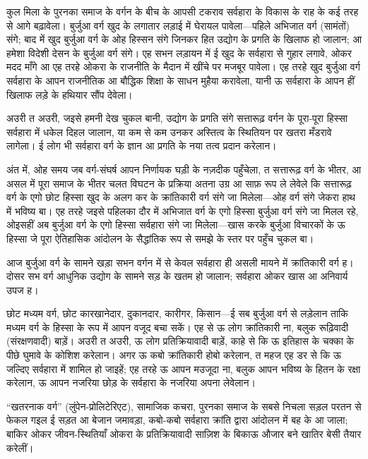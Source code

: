 \documentclass[12pt,a4paper,oneside]{book}
\begin{document}
कुल मिला के पुरनका समाज के वर्गन के बीच के आपसी टकराव सर्वहारा के विकास के राह के कई तरह से आगे बढ़ावेला। बुर्जुआ वर्ग खुद के लगातार लड़ाई में घेरायल पावेला—पहिले अभिजात वर्ग (सामंतों) संगे; बाद में खुद बुर्जुआ वर्ग के ओह हिस्सन संगे जिनकर हित उद्योग के प्रगति के खिलाफ हो जालान; आ हमेशा विदेशी देसन के बुर्जुआ वर्ग संगे। एह सभन लड़ायन में ई खुद के सर्वहारा से गुहार लगावे, ओकर मदद माँगे आ एह तरहे ओकरा के राजनीति के मैदान में खींचे पर मजबूर पावेला। एह तरहे खुद बुर्जुआ वर्ग सर्वहारा के आपन राजनीतिक आ बौद्धिक शिक्षा के साधन मुहैया करावेला, यानी ऊ सर्वहारा के आपन हीं खिलाफ लड़े के हथियार सौंप देवेला।

अउरी त अउरी, जइसे हमनी देख चुकल बानी, उद्योग के प्रगति संगे सत्तारूढ़ वर्गन के पूरा-पूरा हिस्सा सर्वहारा में धकेल दिहल जालान, या कम से कम उनकर अस्तित्व के स्थितियन पर खतरा मँडरावे लागेला। ई लोग भी सर्वहारा वर्ग के ज्ञान आ प्रगति के नया तत्व प्रदान करेलान।

अंत में, ओह समय जब वर्ग-संघर्ष आपन निर्णायक घड़ी के नज़दीक पहुँचेला, त सत्तारूढ़ वर्ग के भीतर, आ असल में पूरा समाज के भीतर चलत विघटन के प्रक्रिया अतना उग्र आ साफ़ रूप ले लेवेले कि सत्तारूढ़ वर्ग के एगो छोट हिस्सा खुद के अलग कर के क्रांतिकारी वर्ग संगे जा मिलेला—ओह वर्ग संगे जेकरा हाथ में भविष्य बा। एह तरहे जइसे पहिलका दौर में अभिजात वर्ग के एगो हिस्सा बुर्जुआ वर्ग संगे जा मिलल रहे, ओइसहीं अब बुर्जुआ वर्ग के एगो हिस्सा सर्वहारा संगे जा मिलेला—खास करके बुर्जुआ विचारकों के ऊ हिस्सा जे पूरा ऐतिहासिक आंदोलन के सैद्धांतिक रूप से समझे के स्तर पर पहुँच चुकल बा।

आज बुर्जुआ वर्ग के सामने खड़ा सभन वर्गन में से केवल सर्वहारा ही असली मायने में क्रांतिकारी वर्ग ह। दोसर सभ वर्ग आधुनिक उद्योग के सामने सड़ के खतम हो जालान; सर्वहारा ओकर खास आ अनिवार्य उपज ह।

छोट मध्यम वर्ग, छोट कारखानेदार, दुकानदार, कारीगर, किसान—ई सब बुर्जुआ वर्ग से लड़ेलान ताकि मध्यम वर्ग के हिस्सा के रूप में आपन वजूद बचा सकें। एह से ऊ लोग क्रांतिकारी ना, बलुक रूढ़िवादी (संरक्षणवादी) बाड़ें। अउरी त अउरी, ऊ लोग प्रतिक्रियावादी बाड़ें, काहे से कि ऊ इतिहास के चक्का के पीछे घुमावे के कोशिश करेलान। अगर ऊ कबो क्रांतिकारी होबो करेलान, त महज एह डर से कि ऊ जल्दिए सर्वहारा में शामिल हो जाइहें; एह तरहे ऊ आपन मउजूदा ना, बलुक आपन भविष्य के हितन के रक्षा करेलान, ऊ आपन नजरिया छोड़ के सर्वहारा के नजरिया अपना लेवेलान।

“खतरनाक वर्ग” (लुंपेन-प्रोलिटेरिएट), सामाजिक कचरा, पुरनका समाज के सबसे निचला सड़ल परतन से फेकल गइल ई सड़त आ बेजान जमावड़ा, कबो-कबो सर्वहारा क्रांति द्वारा आंदोलन में बह के आ जाला; बाकिर ओकर जीवन-स्थितियाँ ओकरा के प्रतिक्रियावादी साज़िश के बिकाऊ औजार बने खातिर बेसी तैयार करेलीं।
\end{document}
